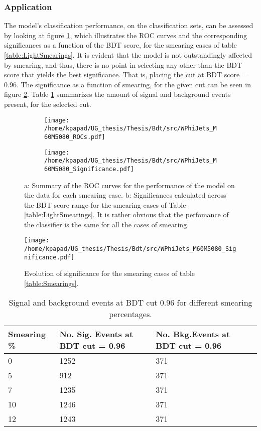 \subsubsection{Application}
\label{sec:org20ae8d1}
\label{sec:Light_application}
The model's classification performance, on the classification sets, can be assessed by looking at figure \ref{fig:LightROCSIG}, which illustrates the ROC curves and the corresponding significances as a function of the BDT score, for the smearing cases of table \ref{table:LightSmearings}. It is evident that the model is not outstandingly affected by smearing, and thus, there is no point in selecting any other than the BDT score that yields the best significance. That is, placing the cut at BDT score = 0.96. The significance as a function of smearing, for the given cut can be seen in figure \ref{fig:LightSigEvolBDT}. Table \ref{table:LightNumSIGBKG} summarizes the amount of signal and background events present, for the selected cut.
\begin{figure}[h!]
\centering
\begin{subfigure}{0.49\textwidth}
\centering
\texttt{[image: /home/kpapad/UG\_thesis/Thesis/Bdt/src/WPhiJets\_M60M5080\_ROCs.pdf]}
\caption{}
\end{subfigure}
\begin{subfigure}{0.49\textwidth}
\centering
\texttt{[image: /home/kpapad/UG\_thesis/Thesis/Bdt/src/WPhiJets\_M60M5080\_Significance.pdf]}
\caption{}
\end{subfigure}
\caption{a: Summary of the ROC curves for the performance of the model on the data for each smearing case. b: Significances calculated across the BDT score range for the smearing cases of Table \ref{table:LightSmearings}. It is rather obvious that the perfomance of the classifier is the same for all the cases of smearing. }
\label{fig:LightROCSIG}
\end{figure}

\begin{figure}[h!]
\centering
\texttt{[image: /home/kpapad/UG\_thesis/Thesis/Bdt/src/WPhiJets\_M60M5080\_Significance.pdf]}
\caption{Evolution of significance for the smearing cases of table \ref{table:Smearings}. }
\label{fig:LightSigEvolBDT}
\end{figure}

\begin{table}[ht]
\centering
\begin{tabular}{|p{2cm}|p{3cm}|p{3cm}|}
 \hline
Smearing \%  & No. Sig. Events at BDT cut = 0.96 & No. Bkg.Events at BDT cut = 0.96 \\
\hline
0 & 1252 & 371 \\
5 & 912 & 371 \\
7 & 1235 & 371 \\
10 & 1246 & 371 \\
12 & 1243 & 371 \\
 \hline
\end{tabular}
\caption{Signal and background events at BDT cut 0.96 for different smearing percentages.}
\label{table:LightNumSIGBKG}
\end{table}

